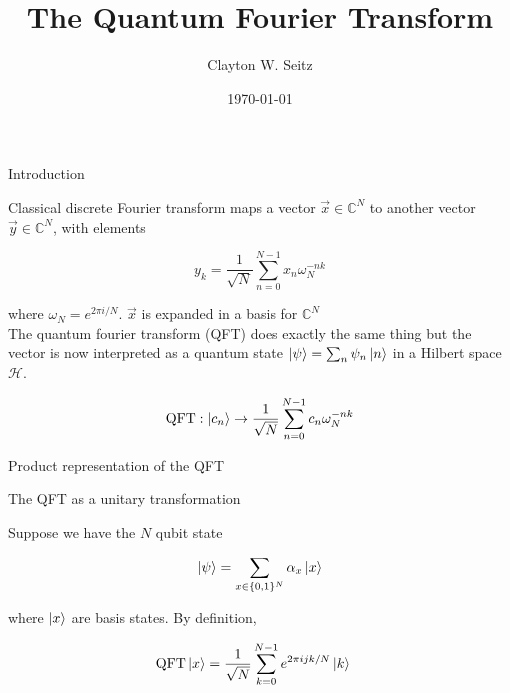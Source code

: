 \documentclass[aspectratio=1610]{beamer}					%
\title{The Quantum Fourier Transform}	%
\author{Clayton W. Seitz}								%
\date{\today}									%
\begin{document}
\begin{frame}
  \titlepage
\end{frame}

\begin{frame}{Introduction}

Classical discrete Fourier transform maps a vector $\vec{x}\in \mathbb{C}^{N}$ to another vector $\vec{y}\in\mathbb{C}^{N}$, with elements

\begin{equation*}
y_{k} = \frac{1}{\sqrt{N}}\sum_{n=0}^{N-1}x_{n}\omega_{N}^{-nk}
\end{equation*}

where $\omega_{N} = e^{2\pi i/N}$. $\vec{x}$ is expanded in a basis for $\mathbb{C}^{N}$\\
\vspace{0.1in}
The quantum fourier transform (QFT) does exactly the same thing but the vector is now interpreted as a quantum state $\ket{\psi}=\sum_{n}\psi_{n}\ket{n}$ in a Hilbert space $\mathcal{H}$. 

\begin{equation*}
\mathrm{QFT}: \ket{c_{n}} \rightarrow \frac{1}{\sqrt{N}}\sum_{n=0}^{N-1}c_{n}\omega_{N}^{-nk}
\end{equation*}


\end{frame}

\begin{frame}{Product representation of the QFT}

\end{frame}

\begin{frame}{The QFT as a unitary transformation}

Suppose we have the $N$ qubit state 

\begin{equation*}
\ket{\psi} = \sum_{x\in\{0,1\}^{N}}\alpha_{x}\ket{x}
\end{equation*}

where $\ket{x}$ are basis states. By definition, 

\begin{align*}
\mathrm{QFT}\ket{x} &= \frac{1}{\sqrt{N}}\sum_{k=0}^{N-1}e^{2\pi ijk/N}\ket{k}
\end{align*}

\end{frame}

\begin{frame}

\end{frame}
\end{document}

